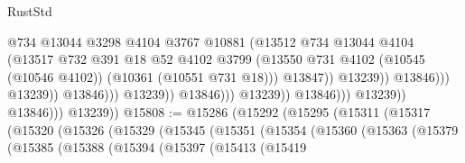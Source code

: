 \begin{lexlean}{RustStd}
\begin{coremodule}
                                                          @734
                                                          @13044
                                                          @3298
                                                          @4104
                                                          @3767
                                                          @10881
                                                          (@13512
                                                            @734
                                                            @13044
                                                            @4104
                                                            (@13517
                                                              @732
                                                              @391
                                                              @18
                                                              @52
                                                              @4102
                                                              @3799
                                                              (@13550
                                                                @731
                                                                @4102
                                                                (@10545 (@10546 @4102))
                                                                (@10361 (@10551 @731 @18)))
                                                              @13847))
                                                          @13239))
                                                      @13846)))
                                                @13239))
                                            @13846)))
                                      @13239))
                                  @13846)))
                            @13239))
                        @13846)))
                  @13239))
              @13846)))
        @13239))
@15808 := @15286
    (@15292
      (@15295
        (@15311
          (@15317
            (@15320
              (@15326
                (@15329
                  (@15345
                    (@15351
                      (@15354
                        (@15360
                          (@15363
                            (@15379
                              (@15385
                                (@15388
                                  (@15394
                                    (@15397
                                      (@15413
                                        (@15419

\end{coremodule}
\end{lexlean}
